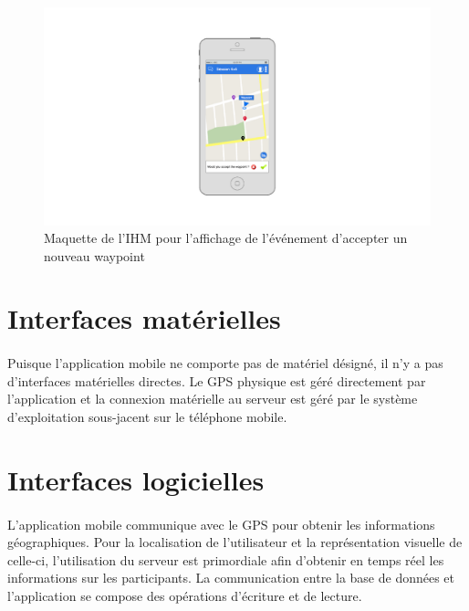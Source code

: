\documentclass[titlepage, 12pt]{report}
\begin{document}
\begin{figure}[!h]
	\caption{Maquette de l'IHM pour l'affichage de l'événement d'accepter un nouveau waypoint}
	\label{accept_waypoint}
	\centering
	\includegraphics[scale=0.3]{images/mockups/accept_waypoint.png}
\end{figure}

\clearpage

\section{Interfaces matérielles}

\paragraph{}Puisque l'application mobile ne comporte pas de matériel désigné, il n'y a pas d'interfaces matérielles directes. Le GPS physique est géré directement par l'application et la connexion matérielle au serveur est géré par le système d'exploitation sous-jacent sur le téléphone mobile. 

\section{Interfaces logicielles}

\paragraph{}L'application mobile communique avec le GPS pour obtenir les informations géographiques. Pour la localisation de l'utilisateur et la représentation visuelle de celle-ci, l'utilisation du serveur est primordiale afin d'obtenir en temps réel les informations sur les participants.
La communication entre la base de données et l'application se compose des opérations d'écriture et de lecture.
\end{document}

